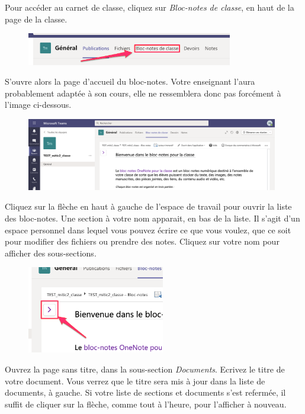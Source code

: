 Pour accéder au carnet de classe, cliquez sur \textit{Bloc-notes de classe}, en haut de la page de la classe.

\begin{figure}[H]
	\includegraphics[width=9cm]{./images/teams/acces_bloc_notes_crop}
	\centering
\end{figure}

S'ouvre alors la page d'accueil du bloc-notes. Votre enseignant l'aura probablement adaptée à son cours, elle ne ressemblera donc pas forcément à l'image ci-dessous.

\begin{figure}[H]
	\includegraphics[width=11cm]{./images/teams/ouvrir_menu_bloc_notes_crop}
	\centering
\end{figure}

Cliquez sur la flèche en haut à gauche de l'espace de travail pour ouvrir la liste des bloc-notes. Une section à votre nom apparait, en bas de la liste. Il s'agit d'un espace personnel dans lequel vous pouvez écrire ce que vous voulez, que ce soit pour modifier des fichiers ou prendre des notes. Cliquez sur votre nom pour afficher des sous-sections.

\begin{figure}[H]
	\includegraphics[width=6cm]{./images/teams/ouvrir_liste_dossiers_docs_crop}
	\centering
\end{figure}

Ouvrez la page sans titre, dans la sous-section \textit{Documents}. Ecrivez le titre de votre document. Vous verrez que le titre sera mis à jour dans la liste de documents, à gauche. Si votre liste de sections et documents s'est refermée, il suffit de cliquer sur la flèche, comme tout à l'heure, pour l'afficher à nouveau.\\

